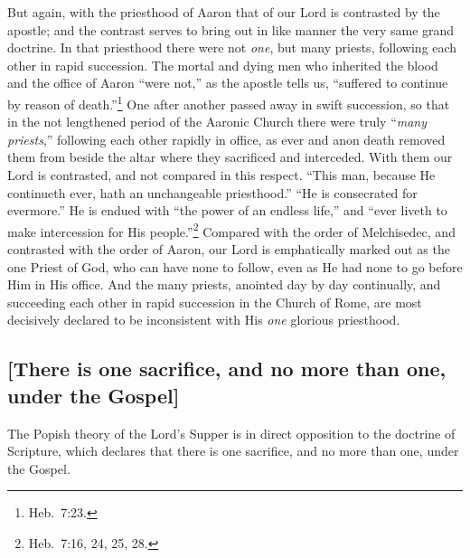 \documentclass[
]{book}
\begin{document}
But again, with the priesthood of Aaron that of our Lord is contrasted by the apostle; and the contrast serves to bring out in like manner the very same grand doctrine. In that priesthood there were not \emph{one}, but many priests, following each other in rapid succession. The mortal and dying men who inherited the blood and the office of Aaron ``were not,'' as the apostle tells us, ``suffered to continue by reason of death.''\footnote{Heb.~7:23.} One after another passed away in swift succession, so that in the not lengthened period of the Aaronic Church there were truly ``\emph{many priests},'' following each other rapidly in office, as ever and anon death removed them from beside the altar where they sacrificed and interceded. With them our Lord is contrasted, and not compared in this respect. ``This man, because He continueth ever, hath an unchangeable priesthood.'' ``He is consecrated for evermore.'' He is endued with ``the power of an endless life,'' and ``ever liveth to make intercession for His people.''\footnote{Heb.~7:16, 24, 25, 28.} Compared with the order of Melchisedec, and contrasted with the order of Aaron, our Lord is emphatically marked out as the one Priest of God, who can have none to follow, even as He had none to go before Him in His office. And the many priests, anointed day by day continually, and succeeding each other in rapid succession in the Church of Rome, are most decisively declared to be inconsistent with His \emph{one} glorious priesthood.

\hypertarget{there-is-one-sacrifice-and-no-more-than-one-under-the-gospel}{%
\subsection{{[}There is one sacrifice, and no more than one, under the Gospel{]}}\label{there-is-one-sacrifice-and-no-more-than-one-under-the-gospel}}

The Popish theory of the Lord's Supper is in direct opposition to the doctrine of Scripture, which declares that there is one sacrifice, and no more than one, under the Gospel.
\end{document}
